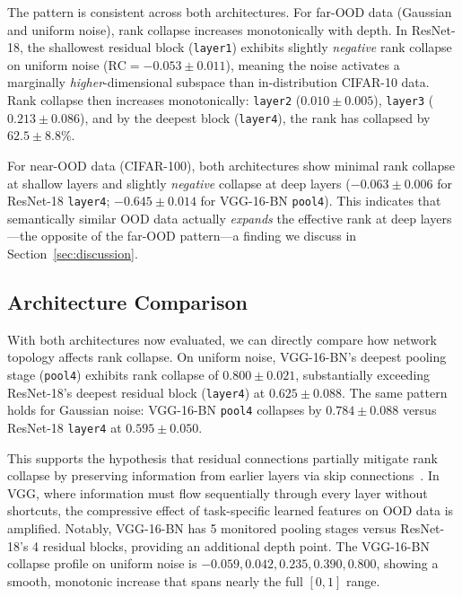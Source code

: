 \documentclass{article}
\begin{document}
The pattern is consistent across both architectures. For far-OOD data (Gaussian and uniform noise), rank collapse increases monotonically with depth. In ResNet-18, the shallowest residual block (\texttt{layer1}) exhibits slightly \emph{negative} rank collapse on uniform noise ($\text{RC} = -0.053 \pm 0.011$), meaning the noise activates a marginally \emph{higher}-dimensional subspace than in-distribution CIFAR-10 data. Rank collapse then increases monotonically: \texttt{layer2} ($0.010 \pm 0.005$), \texttt{layer3} ($0.213 \pm 0.086$), and by the deepest block (\texttt{layer4}), the rank has collapsed by $62.5 \pm 8.8$\%.

For near-OOD data (CIFAR-100), both architectures show minimal rank collapse at shallow layers and slightly \emph{negative} collapse at deep layers ($-0.063 \pm 0.006$ for ResNet-18 \texttt{layer4}; $-0.645 \pm 0.014$ for VGG-16-BN \texttt{pool4}). This indicates that semantically similar OOD data actually \emph{expands} the effective rank at deep layers---the opposite of the far-OOD pattern---a finding we discuss in Section~\ref{sec:discussion}.

\subsection{Architecture Comparison}
\label{sec:arch_comparison}

With both architectures now evaluated, we can directly compare how network topology affects rank collapse. On uniform noise, VGG-16-BN's deepest pooling stage (\texttt{pool4}) exhibits rank collapse of $0.800 \pm 0.021$, substantially exceeding ResNet-18's deepest residual block (\texttt{layer4}) at $0.625 \pm 0.088$. The same pattern holds for Gaussian noise: VGG-16-BN \texttt{pool4} collapses by $0.784 \pm 0.088$ versus ResNet-18 \texttt{layer4} at $0.595 \pm 0.050$.

This supports the hypothesis that residual connections partially mitigate rank collapse by preserving information from earlier layers via skip connections~\citep{veit2016residual}. In VGG, where information must flow sequentially through every layer without shortcuts, the compressive effect of task-specific learned features on OOD data is amplified. Notably, VGG-16-BN has 5 monitored pooling stages versus ResNet-18's 4 residual blocks, providing an additional depth point. The VGG-16-BN collapse profile on uniform noise is $-0.059, 0.042, 0.235, 0.390, 0.800$, showing a smooth, monotonic increase that spans nearly the full $[0, 1]$ range.
\end{document}
